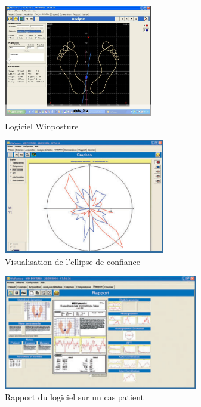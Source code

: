 \begin{figure}[H]
    \centering
    \begin{subfigure}[b]{0.45\textwidth}
      \centering
      \includegraphics[height=5cm]{images/pression_plantaire/winposture.png}
      \caption{Logiciel Winposture}\label{fig:winposture}
    \end{subfigure}
    \begin{subfigure}[b]{0.5\textwidth}
        \centering
        \includegraphics[height=5cm]{images/analyse_marche/winposture_ellipse.png}
        \caption{Visualisation de l'ellipse de confiance}\label{fig:winposture_ellipse_de_confiance}
    \end{subfigure}
    \begin{subfigure}[b]{0.5\textwidth}
        \centering
        \includegraphics[height=5cm]{images/analyse_marche/winposture_rapport.png}
        \caption{Rapport du logiciel sur un cas patient}\label{fig:winposture_rapport}
    \end{subfigure}
    \begin{subfigure}[b]{0.5\textwidth}

\end{subfigure}
\end{figure}
